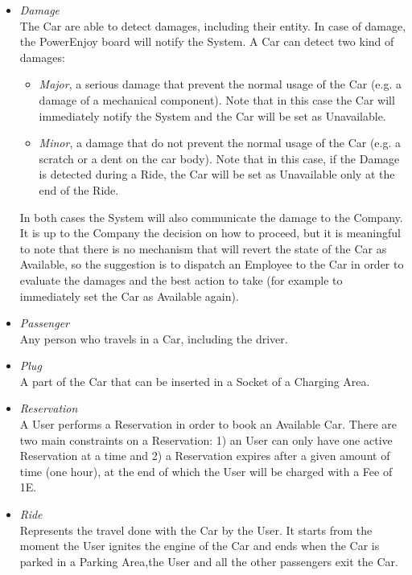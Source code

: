 \begin{itemize}
	\item \emph{Damage} \\
	The Car are able to detect damages, including their entity. In case of damage, the PowerEnjoy board will notify the System. 
	A Car can detect two kind of damages:
	\begin{itemize}
		\item \textit{Major}, a serious damage that prevent the normal usage of the Car (e.g. a damage of a mechanical component). Note that in this case the Car will immediately notify the System and the Car will be set as Unavailable.
		\item \textit{Minor}, a damage that do not prevent the normal usage of the Car (e.g. a scratch or a dent on the car body). Note that in this case, if the Damage is detected during a Ride, the Car will be set as Unavailable only at the end of the Ride.
	\end{itemize}
	In both cases the System will also communicate the damage to the Company. It is up to the Company the decision on how to proceed, but it is meaningful to note that there is no mechanism that will revert the state of the Car as Available, so the suggestion is to dispatch an Employee to the Car in order to evaluate the damages and the best action to take (for example to immediately set the Car as Available again).
	
	\item \emph{Passenger}\\
	Any person who travels in a Car, including the driver. 
	
	\item \emph{Plug}\\
	A part of the Car that can be inserted in a Socket of a Charging Area.
	
	\item \emph{Reservation}\\
	A User performs a Reservation in order to book an Available Car. There are two main constraints on a Reservation: 1) an User can only have one active Reservation at a time and 2) a Reservation expires after a given amount of time (one hour), at the end of which the User will be charged with a Fee of 1E.

	\item \emph{Ride}\\
	Represents the travel done with the Car by the User. It starts from the moment the User ignites the engine of the Car and ends when the Car is parked in a Parking Area,the User and all the other passengers exit the Car.		
\end{itemize}
	
